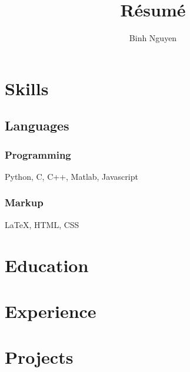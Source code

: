 \documentclass{article}
\begin{document}
\title{R\'esum\'e}
\author{Binh Nguyen}

\maketitle

\section{Skills}

\subsection{Languages}

\subsubsection{Programming}

Python, C, C++, Matlab, Javascript

\subsubsection{Markup}

{\LaTeX}, HTML, CSS

\section{Education}

\section{Experience}

\section{Projects}
\end{document}
